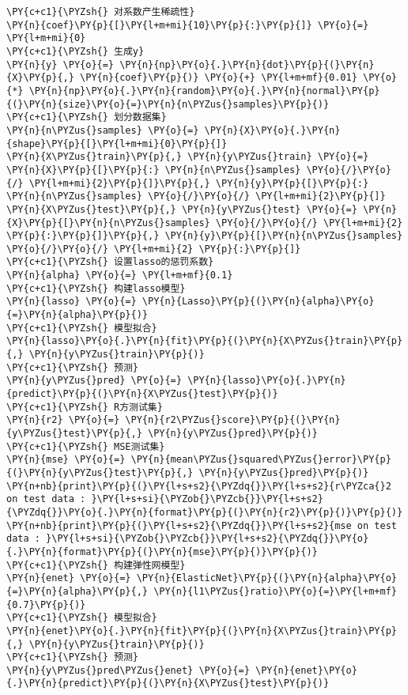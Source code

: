 \begin{Verbatim}[commandchars=\\\{\}]
\PY{c+c1}{\PYZsh{} 对系数产生稀疏性}
\PY{n}{coef}\PY{p}{[}\PY{l+m+mi}{10}\PY{p}{:}\PY{p}{]} \PY{o}{=} \PY{l+m+mi}{0}
\PY{c+c1}{\PYZsh{} 生成y}
\PY{n}{y} \PY{o}{=} \PY{n}{np}\PY{o}{.}\PY{n}{dot}\PY{p}{(}\PY{n}{X}\PY{p}{,} \PY{n}{coef}\PY{p}{)} \PY{o}{+} \PY{l+m+mf}{0.01} \PY{o}{*} \PY{n}{np}\PY{o}{.}\PY{n}{random}\PY{o}{.}\PY{n}{normal}\PY{p}{(}\PY{n}{size}\PY{o}{=}\PY{n}{n\PYZus{}samples}\PY{p}{)}
\PY{c+c1}{\PYZsh{} 划分数据集}
\PY{n}{n\PYZus{}samples} \PY{o}{=} \PY{n}{X}\PY{o}{.}\PY{n}{shape}\PY{p}{[}\PY{l+m+mi}{0}\PY{p}{]}
\PY{n}{X\PYZus{}train}\PY{p}{,} \PY{n}{y\PYZus{}train} \PY{o}{=} \PY{n}{X}\PY{p}{[}\PY{p}{:} \PY{n}{n\PYZus{}samples} \PY{o}{/}\PY{o}{/} \PY{l+m+mi}{2}\PY{p}{]}\PY{p}{,} \PY{n}{y}\PY{p}{[}\PY{p}{:} \PY{n}{n\PYZus{}samples} \PY{o}{/}\PY{o}{/} \PY{l+m+mi}{2}\PY{p}{]}
\PY{n}{X\PYZus{}test}\PY{p}{,} \PY{n}{y\PYZus{}test} \PY{o}{=} \PY{n}{X}\PY{p}{[}\PY{n}{n\PYZus{}samples} \PY{o}{/}\PY{o}{/} \PY{l+m+mi}{2} \PY{p}{:}\PY{p}{]}\PY{p}{,} \PY{n}{y}\PY{p}{[}\PY{n}{n\PYZus{}samples} \PY{o}{/}\PY{o}{/} \PY{l+m+mi}{2} \PY{p}{:}\PY{p}{]}
\PY{c+c1}{\PYZsh{} 设置lasso的惩罚系数}
\PY{n}{alpha} \PY{o}{=} \PY{l+m+mf}{0.1}
\PY{c+c1}{\PYZsh{} 构建lasso模型}
\PY{n}{lasso} \PY{o}{=} \PY{n}{Lasso}\PY{p}{(}\PY{n}{alpha}\PY{o}{=}\PY{n}{alpha}\PY{p}{)}
\PY{c+c1}{\PYZsh{} 模型拟合}
\PY{n}{lasso}\PY{o}{.}\PY{n}{fit}\PY{p}{(}\PY{n}{X\PYZus{}train}\PY{p}{,} \PY{n}{y\PYZus{}train}\PY{p}{)}
\PY{c+c1}{\PYZsh{} 预测}
\PY{n}{y\PYZus{}pred} \PY{o}{=} \PY{n}{lasso}\PY{o}{.}\PY{n}{predict}\PY{p}{(}\PY{n}{X\PYZus{}test}\PY{p}{)}
\PY{c+c1}{\PYZsh{} R方测试集}
\PY{n}{r2} \PY{o}{=} \PY{n}{r2\PYZus{}score}\PY{p}{(}\PY{n}{y\PYZus{}test}\PY{p}{,} \PY{n}{y\PYZus{}pred}\PY{p}{)}
\PY{c+c1}{\PYZsh{} MSE测试集}
\PY{n}{mse} \PY{o}{=} \PY{n}{mean\PYZus{}squared\PYZus{}error}\PY{p}{(}\PY{n}{y\PYZus{}test}\PY{p}{,} \PY{n}{y\PYZus{}pred}\PY{p}{)}
\PY{n+nb}{print}\PY{p}{(}\PY{l+s+s2}{\PYZdq{}}\PY{l+s+s2}{r\PYZca{}2 on test data : }\PY{l+s+si}{\PYZob{}\PYZcb{}}\PY{l+s+s2}{\PYZdq{}}\PY{o}{.}\PY{n}{format}\PY{p}{(}\PY{n}{r2}\PY{p}{)}\PY{p}{)}
\PY{n+nb}{print}\PY{p}{(}\PY{l+s+s2}{\PYZdq{}}\PY{l+s+s2}{mse on test data : }\PY{l+s+si}{\PYZob{}\PYZcb{}}\PY{l+s+s2}{\PYZdq{}}\PY{o}{.}\PY{n}{format}\PY{p}{(}\PY{n}{mse}\PY{p}{)}\PY{p}{)}
\PY{c+c1}{\PYZsh{} 构建弹性网模型}
\PY{n}{enet} \PY{o}{=} \PY{n}{ElasticNet}\PY{p}{(}\PY{n}{alpha}\PY{o}{=}\PY{n}{alpha}\PY{p}{,} \PY{n}{l1\PYZus{}ratio}\PY{o}{=}\PY{l+m+mf}{0.7}\PY{p}{)}
\PY{c+c1}{\PYZsh{} 模型拟合}
\PY{n}{enet}\PY{o}{.}\PY{n}{fit}\PY{p}{(}\PY{n}{X\PYZus{}train}\PY{p}{,} \PY{n}{y\PYZus{}train}\PY{p}{)}
\PY{c+c1}{\PYZsh{} 预测}
\PY{n}{y\PYZus{}pred\PYZus{}enet} \PY{o}{=} \PY{n}{enet}\PY{o}{.}\PY{n}{predict}\PY{p}{(}\PY{n}{X\PYZus{}test}\PY{p}{)}

\end{Verbatim}
